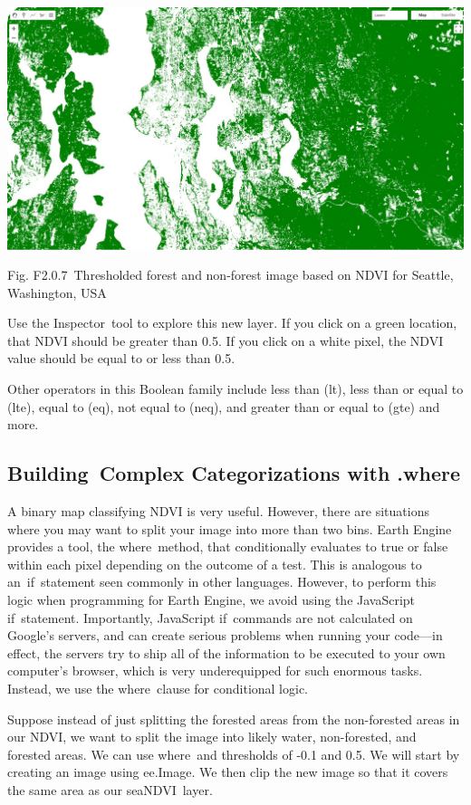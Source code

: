 \documentclass[
  letterpaper,
  DIV=11,
  numbers=noendperiod]{scrreprt}
\begin{document}
\includegraphics{./F2/image47.png}

Fig. F2.0.7~Thresholded forest and non-forest image based on NDVI for
Seattle, Washington, USA

Use the Inspector~tool to explore this new layer. If you click on a
green location, that NDVI should be greater than 0.5. If you click on a
white pixel, the NDVI value should be equal to or less than 0.5.

Other operators in this Boolean family include less than (lt), less than
or equal to (lte), equal to (eq), not equal to (neq), and greater than
or equal to (gte) and more.

\hypertarget{building-complex-categorizations-with-.where}{%
\subsection{Building~Complex Categorizations with
.where}\label{building-complex-categorizations-with-.where}}

A binary map classifying NDVI is very useful. However, there are
situations where you may want to split your image into more than two
bins. Earth Engine provides a tool, the where~method, that conditionally
evaluates to true or false within each pixel depending on the outcome of
a test. This is analogous to an~if~statement seen commonly in other
languages. However, to perform this logic when programming for Earth
Engine, we avoid using the JavaScript if~statement. Importantly,
JavaScript if~commands are not calculated on Google's servers, and can
create serious problems when running your code---in effect, the servers
try to ship all of the information to be executed to your own computer's
browser, which is very underequipped for such enormous tasks. Instead,
we use the where~clause for conditional logic.

Suppose instead of just splitting the forested areas from the
non-forested areas in our NDVI, we want to split the image into likely
water, non-forested, and forested areas. We can use where~and thresholds
of -0.1 and 0.5. We will start by creating an image using ee.Image. We
then clip the new image so that it covers the same area as our
seaNDVI~layer.
\end{document}

